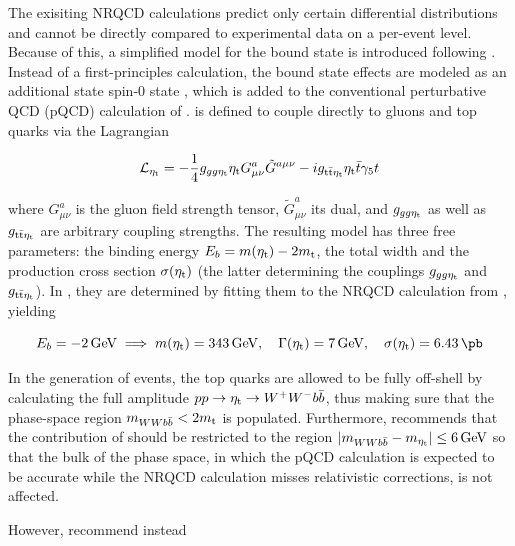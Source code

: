 The exisiting NRQCD calculations predict only certain differential distributions and cannot be directly compared to experimental data on a per-event level. Because of this, a simplified model for the \ttbar bound state is introduced following . Instead of a first-principles calculation, the bound state effects are modeled as an additional state spin-0 state \etat, which is added to the conventional perturbative QCD (pQCD) calculation of \ttbar. \etat is defined to couple directly to gluons and top quarks via the Lagrangian

\begin{equation}
\label{eq:theory:etatlagrangian}
  \mathcal{L}_{\mathrm{\eta_t}} = - \frac{1}{4} g_{gg \mathrm{\eta_t}} \mathrm{\eta_t} G^{a}_{\mu \nu} \tilde{G}^{a \mu \nu} - i g_{\mathrm{t \bar{t}} \mathrm{\eta_t}} \mathrm{\eta_t} \bar{t} \gamma_5 t
\end{equation}

\noindent where $G^{a}_{\mu \nu}$ is the gluon field strength tensor, $\tilde{G}^{a}_{\mu \nu}$ its dual, and $g_{gg \mathrm{\eta_t}}$ as well as $g_{\mathrm{t \bar{t}} \mathrm{\eta_t}}$ are arbitrary coupling strengths. The resulting model has three free parameters: the binding energy $E_b = m(\mathrm{\eta_t}) - 2 m_{\mathrm{t}}$, the total width \Gammaetat and the production cross section $\sigma(\mathrm{\eta_t})$ (the latter determining the couplings $g_{gg \mathrm{\eta_t}}$ and $g_{\mathrm{t \bar{t}} \mathrm{\eta_t}}$). In , they are determined by fitting them to the NRQCD calculation from , yielding

\begin{equation}
  \label{eq:theory:etatparams_7gev}
  E_b = \SI{-2}{\GeV} \implies \metat = \SI{343}{\GeV}, \quad \Gammaetat = \SI{7}{\GeV}, \quad \sigma(\etat) = \SI{6.43}{\pb}
\end{equation}

In the generation of events, the top quarks are allowed to be fully off-shell by calculating the full amplitude $p p \rightarrow \mathrm{\eta_t} \rightarrow W^+ W^- b \bar{b}$, thus making sure that the phase-space region $m_{WWb\bar{b}} < 2 m_{\mathrm{t}}$ is populated. Furthermore,  recommends that the contribution of \etat should be restricted to the region $|m_{WWb\bar{b}} - m_{\mathrm{\eta_t}}| \leq \SI{6}{GeV}$ so that the bulk of the \ttbar phase space, in which the pQCD calculation is expected to be accurate while the NRQCD calculation misses relativistic corrections, is not affected.

However,  recommend instead

